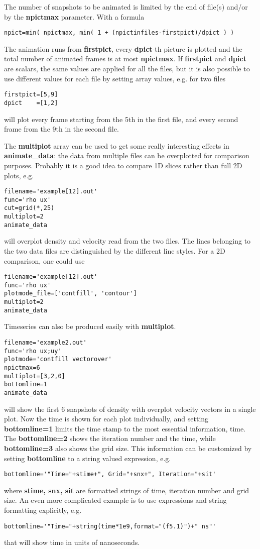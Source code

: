\documentclass{article}
\begin{document}
The number of snapshots to be animated is limited by the end of 
file(s) and/or by the {\bf npictmax} parameter. With a formula
\begin{verbatim}
npict=min( npictmax, min( 1 + (npictinfiles-firstpict)/dpict ) )
\end{verbatim}
The animation runs from {\bf firstpict}, every {\bf dpict}-th picture is
plotted and the total number of animated frames is at most {\bf npictmax}. 
If {\bf firstpict} and {\bf dpict} are scalars, the same values are
applied for all the files, but it is also possible to use different
values for each file by setting array values, e.g. for two files
\begin{verbatim}
firstpict=[5,9]
dpict    =[1,2]
\end{verbatim}
will plot every frame starting from the 5th in the first file,
and every second frame from the 9th in the second file.

The {\bf multiplot} array can be used to get some really interesting
effects in {\bf animate\_data}: 
the data from multiple files can be overplotted for comparison purposes.
Probably it is a good idea to compare 1D slices rather than full 2D plots,
e.g. 
\begin{verbatim}
filename='example[12].out'
func='rho ux'
cut=grid(*,25)
multiplot=2
animate_data
\end{verbatim}
will overplot density and velocity read from the two files. 
The lines belonging to the two data files are distinguished by
the different line styles. For a 2D comparison, one could use
\begin{verbatim}
filename='example[12].out'
func='rho ux'
plotmode_file=['contfill', 'contour']
multiplot=2
animate_data
\end{verbatim}
Timeseries can also be produced easily with {\bf multiplot}. 
\begin{verbatim}
filename='example2.out'
func='rho ux;uy'
plotmode='contfill vectorover'
npictmax=6
multiplot=[3,2,0]
bottomline=1
animate_data
\end{verbatim}
will show the first 6 snapshots of density with overplot velocity vectors
in a single plot. 
Now the time is shown for each plot individually, and setting
{\bf bottomline=1} limits the time stamp to the most essential
information, time. The {\bf bottomline=2} shows the iteration number
and the time, while {\bf bottomline=3} also shows the grid size.
This information can be customized by setting {\bf bottomline} to
a string valued expression, e.g.
\begin{verbatim}
bottomline='"Time="+stime+", Grid="+snx+", Iteration="+sit'
\end{verbatim}
where {\bf stime, snx, sit} are formatted strings of time, iteration number
and grid size. An even more complicated example is to use expressions and
string formatting explicitly, e.g.
\begin{verbatim}
bottomline='"Time="+string(time*1e9,format="(f5.1)")+" ns"'
\end{verbatim}
that will show time in units of nanoseconds.
\end{document}
